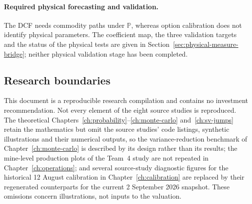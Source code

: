 \paragraph{Required physical forecasting and validation.}
The DCF needs commodity paths under $\mathbb P$, whereas option calibration
does not identify physical parameters. The coefficient map, the three
validation targets and the status of the physical tests are given in
Section~\ref{sec:physical-measure-bridge}; neither physical validation stage
has been completed.

\subsection{Research boundaries}

This document is a reproducible research compilation and contains no
investment recommendation. Not every element of the eight source studies is
reproduced. The theoretical Chapters~\ref{ch:probability}--\ref{ch:monte-carlo}
and~\ref{ch:sv-jumps} retain the mathematics but omit the source studies'
code listings, synthetic illustrations and their numerical outputs, so the
variance-reduction benchmark of Chapter~\ref{ch:monte-carlo} is described by its
design rather than its results; the mine-level production plots of the Team~4
study are not repeated in Chapter~\ref{ch:operations}; and several
source-study diagnostic figures for the historical 12 August calibration in
Chapter~\ref{ch:calibration} are replaced by their regenerated counterparts for
the current 2 September 2026 snapshot. These omissions concern illustrations,
not inputs to the valuation.
